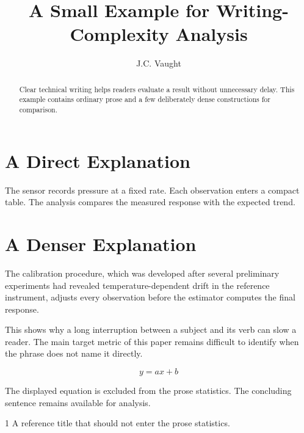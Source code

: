 \documentclass{article}
\title{A Small Example for Writing-Complexity Analysis}
\author{J.C. Vaught}
\begin{document}
\maketitle

\begin{abstract}
Clear technical writing helps readers evaluate a result without unnecessary delay. This example contains ordinary prose and a few deliberately dense constructions for comparison.
\end{abstract}

\section{A Direct Explanation}

The sensor records pressure at a fixed rate. Each observation enters a compact table. The analysis compares the measured response with the expected trend.

\section{A Denser Explanation}

The calibration procedure, which was developed after several preliminary experiments had revealed temperature-dependent drift in the reference instrument, adjusts every observation before the estimator computes the final response.

This shows why a long interruption between a subject and its verb can slow a reader. The main target metric of this paper remains difficult to identify when the phrase does not name it directly.

\begin{equation}
  y = a x + b
\end{equation}

The displayed equation is excluded from the prose statistics. The concluding sentence remains available for analysis.

\begin{thebibliography}{1}
 A reference title that should not enter the prose statistics.
\end{thebibliography}
\end{document}
